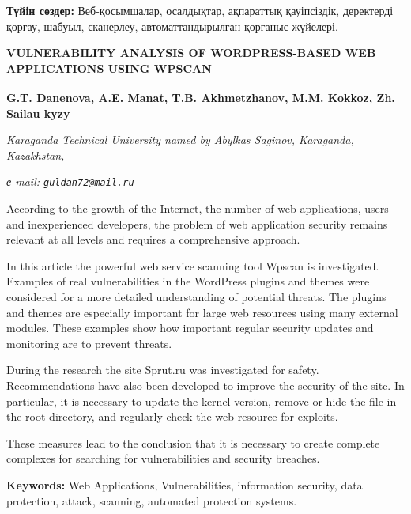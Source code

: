 {\bfseries Түйін сөздер:} Веб-қосымшалар, осалдықтар, ақпараттық қауіпсіздік,
деректерді қорғау, шабуыл, сканерлеу, автоматтандырылған қорғаныс
жүйелері.

\begin{articleheader}
{\bfseries VULNERABILITY ANALYSIS OF WORDPRESS-BASED WEB APPLICATIONS USING WPSCAN}

{\bfseries
G.T. Danenova\textsuperscript{\envelope },
A.E. Manat,
T.B. Akhmetzhanov,
M.M. Kokkoz,
Zh. Sailau kyzy}
\end{articleheader}

\begin{affiliation}
\emph{Karaganda Technical University named by Abylkas Saginov, Karaganda, Kazakhstan,}

\emph{е-mail: \href{mailto:guldan72@mail.ru}{\nolinkurl{guldan72@mail.ru}}}
\end{affiliation}

According to the growth of the Internet, the number of web applications,
users and inexperienced developers, the problem of web application
security remains relevant at all levels and requires a comprehensive
approach.

In this article the powerful web service scanning tool Wpscan is
investigated. Examples of real vulnerabilities in the WordPress plugins
and themes were considered for a more detailed understanding of
potential threats. The plugins and themes are especially important for
large web resources using many external modules. These examples show how
important regular security updates and monitoring are to prevent
threats.

During the research the site Sprut.ru was investigated for safety.
Recommendations have also been developed to improve the security of the
site. In particular, it is necessary to update the kernel version,
remove or hide the file in the root directory, and regularly check the
web resource for exploits.

These measures lead to the conclusion that it is necessary to create
complete complexes for searching for vulnerabilities and security
breaches.

{\bfseries Keywords:} Web Applications, Vulnerabilities, information security, data
protection, attack, scanning, automated protection systems.

